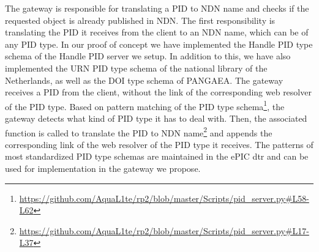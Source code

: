 The gateway is responsible for translating a PID to NDN name and checks if the requested object is already published in NDN. 
The first responsibility is translating the PID it receives from the client to an NDN name, which can be of any PID type. In our proof of concept we have implemented the Handle PID type schema of the Handle PID server we setup. In addition to this, we have also implemented the URN PID type schema of the national library of the Netherlands, as well as the DOI type schema of PANGAEA. The gateway receives a PID from the client, without the link of the corresponding web resolver of the PID type. Based on pattern matching of the PID type schema\footnote{\url{https://github.com/AquaL1te/rp2/blob/master/Scripts/pid_server.py\#L58-L62}}, the gateway detects what kind of PID type it has to deal with. Then, the associated function is called to translate the PID to NDN name\footnote{\url{https://github.com/AquaL1te/rp2/blob/master/Scripts/pid_server.py\#L17-L37}} and appends the corresponding link of the web resolver of the PID type it receives. 
The patterns of most standardized PID type schemas are maintained in the ePIC \gls{dtr} \cite{dtr} and can be used for implementation in the gateway we propose. 

